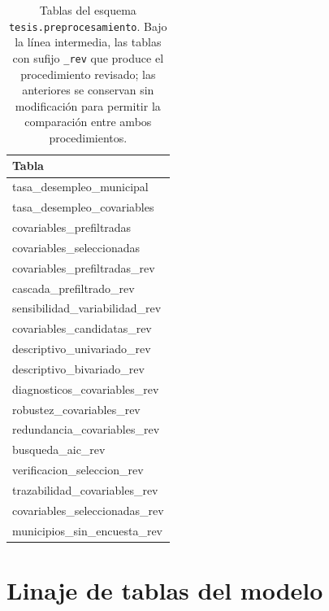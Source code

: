     \begin{table}[H]
    \centering
    \small
    \begin{tabular}{>{\raggedright\arraybackslash\ttfamily}l}
    \toprule
    \textbf{\normalfont Tabla} \\
    \midrule
    tasa\_desempleo\_municipal \\
    tasa\_desempleo\_covariables \\
    covariables\_prefiltradas \\
    covariables\_seleccionadas \\
    \midrule
    covariables\_prefiltradas\_rev \\
    cascada\_prefiltrado\_rev \\
    sensibilidad\_variabilidad\_rev \\
    covariables\_candidatas\_rev \\
    descriptivo\_univariado\_rev \\
    descriptivo\_bivariado\_rev \\
    diagnosticos\_covariables\_rev \\
    robustez\_covariables\_rev \\
    redundancia\_covariables\_rev \\
    busqueda\_aic\_rev \\
    verificacion\_seleccion\_rev \\
    trazabilidad\_covariables\_rev \\
    covariables\_seleccionadas\_rev \\
    municipios\_sin\_encuesta\_rev \\
    \bottomrule
    \end{tabular}
    \caption{Tablas del esquema \texttt{tesis.preprocesamiento}. Bajo la línea intermedia, las tablas con sufijo \texttt{\_rev} que produce el procedimiento revisado; las anteriores se conservan sin modificación para permitir la comparación entre ambos procedimientos.}
    \label{tab:tablas_preprocesamiento}
    \end{table}

\section{Linaje de tablas del modelo}
\label{sec:apendice-linaje-modelo}

